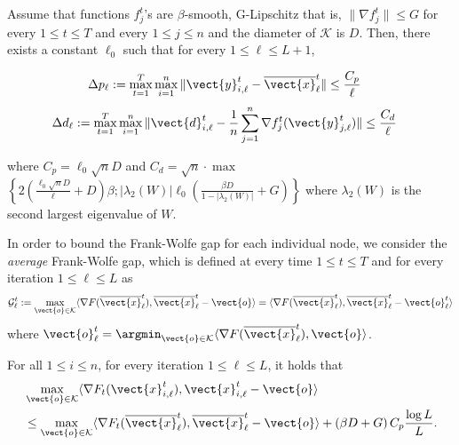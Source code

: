 \begin{lemma}	\label{lem:convergence}
Assume that functions $f^{t}_{j}$'s are $\beta$-smooth, G-Lipschitz that is, $\| \nabla f^{t}_{j}\|  \leq G$
for every $1 \leq t \leq T$ and every $1 \leq j \leq n$ and the diameter of $\mathcal{K}$ is $D$.
Then, there exists a constant $\ell_{0}$ such that for every $1 \leq \ell \leq L+1$, 
\begin{linenomath}
\begin{align*}
	\Delta p_{\ell} := \max_{t=1}^{T} \max_{i = 1}^{n} \| \vect{y}^{t}_{i,\ell} - \overline{\vect{x}}^{t}_{\ell} \| 
		&\leq \frac{C_{p}}{\ell} 
\end{align*}
\begin{align*}
	\Delta d_{\ell} := \max_{t=1}^{T} \max_{i = 1}^{n} \| \vect{d}^{t}_{i,\ell} - \frac{1}{n}\sum_{j=1}^n \nabla f^t_j (\vect{y}^t_{j,\ell})  \| 
		&\leq \frac{C_{d}}{\ell}
\end{align*}
\end{linenomath}
where 
$C_{p}=\ell_{0}\sqrt{n} D$ and $C_{d}=\sqrt{n} \cdot \max $ $\left \{ 2 \left ( \frac{\ell_{0} \sqrt{n} D}{\ell} +D \right )\beta ;
|\lambda_{2}(W)| \ell_{0} \left ( \frac{\beta D}{1 - |\lambda_{2}(W)|}+ G \right) \right\}
$ where $\lambda_2(W)$ is the second largest eigenvalue of $W$.
\end{lemma}


In order to bound the Frank-Wolfe gap for each individual node, we consider the \emph{average} Frank-Wolfe gap, 
which is defined at every time $1 \leq t \leq T$ and for every iteration $1 \leq \ell \leq L$ as 
\begin{equation}
 \mathcal{G}^t_{\ell} := \max_{\vect{o} \in \mathcal{K}}\langle \nabla F(\overline{\vect{x}}^t_{\ell}), \overline{\vect{x}}^t_{\ell} - \vect{o}\rangle = \langle \nabla F(\overline{\vect{x}}^t_{\ell}), \overline{\vect{x}}^t_{\ell} - \vect{o}^t_{\ell}\rangle
\end{equation} 
where $\vect{o}^t_{\ell} = \argmin_{\vect{o} \in \mathcal{K}}\langle \nabla F(\overline{\vect{x}}^t_{\ell}), \vect{o} \rangle$.

\begin{lemma}
\label{lemma:final_step}
For all $1 \leq i \leq n$, for every iteration $1 \leq \ell \leq L$, it holds that
\begin{align*}
    & \max_{\vect{o} \in \mathcal{K}}\langle \nabla F_t (\vect{x}^t_{i,\ell}), \vect{x}^t_{i,\ell} - \vect{o} \rangle  \\
    & \leq \max_{\vect{o} \in \mathcal{K}}\langle \nabla F_t (\overline{\vect{x}}^t_{\ell}), \overline{\vect{x}}^t_{\ell} - \vect{o} \rangle
    + \left(\beta D + G \right)C_p \frac{\log L}{L}.
\end{align*}
\end{lemma}

